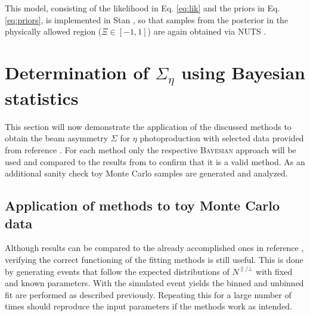  This model, consisting of the likelihood in Eq. \eqref{eq:lik} and the priors in Eq. \eqref{eq:priors}, is implemented in Stan \cite{stan}, so that samples from the posterior in the physically allowed region ($\Xi\in[-1,1]$) are again obtained via NUTS \cite{nuts}.


\section{Determination of $\Sigma_{\eta}$ using Bayesian statistics}
\label{sec:sigmaeta}
This section will now demonstrate the application of the discussed methods to obtain the beam asymmetry $\Sigma$ for $\eta$ photoproduction with selected data provided from reference \cite{farahphd}. For each method only the respective \textsc{Bayesian} approach will be used and compared to the results from \cite{farahphd} to confirm that it is a valid method. As an additional sanity check toy Monte Carlo samples are generated and analyzed. 
\subsection{Application of methods to toy Monte Carlo data}
\label{subsec:toyMC}
Although results can be compared to the already accomplished ones in reference \cite{farahphd}, verifying the correct functioning of the fitting methods is still useful. This is done by generating events that follow the expected distributions of $N^{\parallel/\bot}$ with fixed and known parameters. With the simulated event yields the binned and unbinned fit are performed as described previously. Repeating this for a large number of times should reproduce the input parameters if the methods work as intended.
